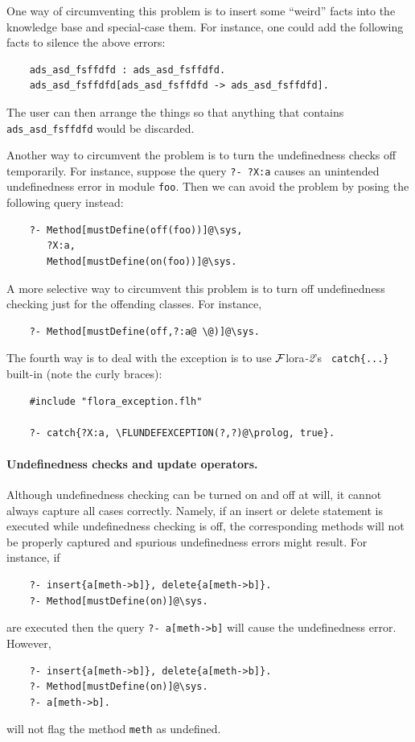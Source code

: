 \documentclass[11pt]{article}
\newcommand{\FLORA}{{\mbox{\sc ${\cal F}${lora}\rm\emph{-2}}}\xspace}
\newcommand{\FLSYSTEM}{\FLORA}
\newcommand{\FLUNDEFEXCEPTION}{FLORA\_UNDEFINED\_EXCEPTION}
\begin{document}
One way of circumventing this problem is to insert some ``weird''
facts into the
knowledge base and special-case them. For instance, one could add
the following facts to silence the above errors:
\begin{verbatim}
    ads_asd_fsffdfd : ads_asd_fsffdfd.
    ads_asd_fsffdfd[ads_asd_fsffdfd -> ads_asd_fsffdfd].
\end{verbatim}
The user can then arrange the things so that anything that contains
{\tt ads\_asd\_fsffdfd} would be discarded.

Another way to circumvent  the problem is to turn the undefinedness checks
off temporarily. For instance, suppose the query {\tt ?- ?X:a} causes
an unintended undefinedness error in module {\tt foo}. Then we can avoid the
problem by posing the following query instead:
\begin{verbatim}
    ?- Method[mustDefine(off(foo))]@\sys,
       ?X:a,
       Method[mustDefine(on(foo))]@\sys.
\end{verbatim}
A more selective way to circumvent this problem is to turn off
undefinedness checking just for the offending classes. For instance,
\begin{verbatim}
    ?- Method[mustDefine(off,?:a@ \@)]@\sys.
\end{verbatim}

The fourth way is to deal with the exception is to use \FLSYSTEM's {\tt
  catch\{...\}} built-in (note the curly braces):
\begin{verbatim}
    #include "flora_exception.flh"

    ?- catch{?X:a, \FLUNDEFEXCEPTION(?,?)@\prolog, true}.
\end{verbatim}

\paragraph{Undefinedness checks and update operators.}
Although undefinedness checking can be turned on and off at will, it cannot
always capture all cases correctly. Namely, if an insert or delete
statement is executed while undefinedness checking is off, the
corresponding methods will not be properly captured and spurious
undefinedness errors might result.
For instance, if
\begin{verbatim}
    ?- insert{a[meth->b]}, delete{a[meth->b]}.
    ?- Method[mustDefine(on)]@\sys.
\end{verbatim}
are executed then the query {\tt ?- a[meth->b]} will cause the
undefinedness error. However,
\begin{verbatim}
    ?- insert{a[meth->b]}, delete{a[meth->b]}.
    ?- Method[mustDefine(on)]@\sys.
    ?- a[meth->b].
\end{verbatim}
will not flag the method {\tt meth} as undefined.
\end{document}
